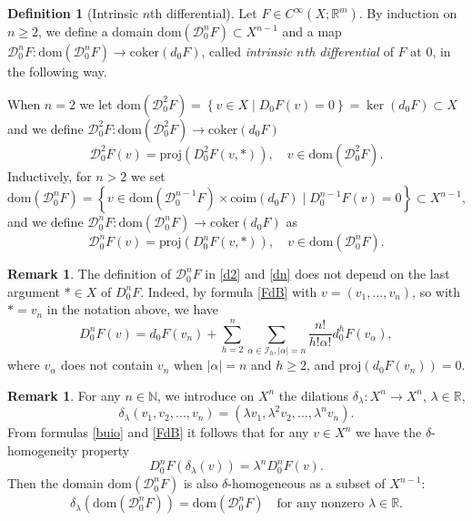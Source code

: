 \documentclass[12pt, reqno]{amsart}
\theoremstyle{plain}
\theoremstyle{definition}
\newtheorem{definition}[theorem]{Definition}
\newtheorem{remark}[theorem]{Remark}
\theoremstyle{remark}
\numberwithin{equation}{section}
\newcommand{\R}{\mathbb{R}}
\newcommand{\N}{\mathbb{N}}
\newcommand{\0}{\theta}
\renewcommand{\a}{\alpha}
\newcommand{\1}{{-1}}
\renewcommand{\=}{\coloneqq}
\renewcommand{\.}{\dots}
\newcommand{\mc}{\mathcal}
\newcommand{\proj}{\mathrm{proj}}
\newcommand{\coker}{\mathrm{coker}}
\newcommand{\dom}{\mathrm{dom}}
\newcommand{\be}{\begin{equation}}
\newcommand{\ee}{\end{equation}}
\begin{document}
 

\begin{definition}[Intrinsic $n$th differential]\label{definition:diffs} 
Let $F\in C^\infty(X;\R^m)$.  By induction on $n\geq 2$,
we define a domain $   \dom(\mc D_0^nF)\subset X^{n-1} $ and a map $\mc D_0^n F:\dom(\mc D_0^n F)\to \coker(d_0F)$, called
 \emph{intrinsic $n$th differential} of $F$ at $0$, in the following way.

 When $n=2$ we let $ \dom(\mc D_0^2F)=\left\{v\in X\mid D_0F(v)=0 \right\}=\ker(d_0F) \subset X$ and we define
$
 \mc D_0^2F:\dom(\mc D_0^2F)\to \coker(d_0F)$  
  \begin{equation}\label{d2}
 \mc D_0^2F(v) =   \proj(D_0^2F(v,*)),\quad v\in \dom(\mc D_0^2F).  
 \end{equation}
 Inductively, for $n>2$ we set  
 \[
  \dom(\mc D_0^nF)=\left\{v \in \dom(\mc D_0^{n-1}F)\times \mathrm{coim}(d_0F) \mid D_0^{n-1}F(v)=0 \right\}\subset X^{n-1},
 \]
 and we define  $  \mc D_0^n F:\dom(\mc D_0^n F)\to \coker(d_0F)$ as 
 \begin{equation}\label{dn}
   \mc D_0^n F(v)=\proj(D_0^nF(v,*)), \quad v \in \dom(\mc D_0^nF).  \end{equation}
\end{definition}

\begin{remark}
 The definition of $\mc D_0^n F$ in \eqref{d2} and \eqref{dn}  does not depend on the last argument $*\in X$  of $D_0^nF$.
 Indeed, by formula \eqref{FdB} with $v=(v_1,\dots,v_n)$, so with  $*=v_n$ in the notation above, we have
 \begin{equation}\label{FUF}
 D_0^nF(v)=d_0 F(v_n) + \sum_{h=2}^n\sum_{\a\in \mathscr I_h, |\a|=n}\frac{n!}{h!\a!}d_0^hF(v_\a),
 \end{equation}
 where $v_\a$ does not contain $v_n$ when $|\a| = n$ and $ h \geq 2$, and $\proj(d_0 F(v_n))=0$.
 \end{remark}



{\color{black}

\begin{remark}  For any $n\in\N$,  we   introduce on  $X^{n}$ the  dilations $\delta_\lambda: X^{n}\to X^{n}$, $\lambda \in \R$,
\[
\delta_\lambda (v_1,v_2,\ldots,v_{n}) = (\lambda v_1,\lambda^ 2 v_2,\ldots,\lambda^{n} v_{n}).
\] 
From formulas \eqref{buio} and \eqref{FdB} it follows that for any $v\in X^n$ we have the $\delta$-homogeneity property
\[
 D_0 ^n F (\delta_\lambda (v)) = \lambda ^n D_0 ^n F(v).
\]
Then the domain  $\dom(\mc D_0^n F)$ is also $\delta$-homogeneous as a subset of $X^{n-1}$:
\be\label{DH}
\delta_\lambda( \dom(\mc D_0^n F)) = \dom(\mc D_0^n F) \quad \textrm{for any nonzero }\lambda \in \R.
\ee
 \end{remark}
}
\end{document}

